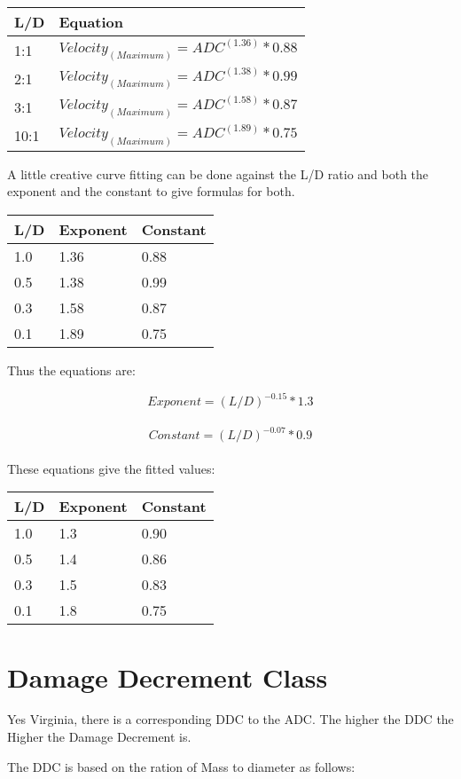 \begin{tabular}{ll} \hline 
L/D			& Equation \\ \hline 
1:1			& \(Velocity_{(Maximum)} = ADC^{(1.36)} * 0.88 \)\\  
2:1			& \(Velocity_{(Maximum)} = ADC^{(1.38)} * 0.99 \) \\
3:1			& \(Velocity_{(Maximum)} = ADC^{(1.58)} * 0.87 \) \\
10:1		& \(Velocity_{(Maximum)} = ADC^{(1.89)} * 0.75 \) \\ 
\hline 
\end{tabular}

A little creative curve fitting can be done against the L/D ratio 
and both the exponent and the constant to give formulas for both.

\begin{tabular}{lll} \hline 
L/D	& Exponent	& Constant \\ \hline 
1.0	& 1.36	   & 0.88 \\
0.5 & 1.38     & 0.99 \\
0.3 & 1.58     & 0.87 \\
0.1 & 1.89     & 0.75 \\ \hline 
\end{tabular}

Thus the equations are:

\[Exponent = (L/D)^{-0.15} * 1.3 \] \\  
\[Constant = (L/D)^{-0.07} * 0.9 \] \\

These equations give the fitted values:

\begin{tabular}{lll} \hline   
L/D	& Exponent	& Constant \\ \hline 
1.0 & 1.3       &  0.90 \\
0.5 & 1.4       &  0.86 \\
0.3 & 1.5       &  0.83 \\
0.1 & 1.8       &  0.75 \\ \hline 
\end{tabular}

\section{Damage Decrement Class}

Yes Virginia, there is a corresponding DDC to the ADC. The higher 
the DDC the Higher the Damage Decrement is.

The DDC is based on the ration of Mass to diameter as follows:

